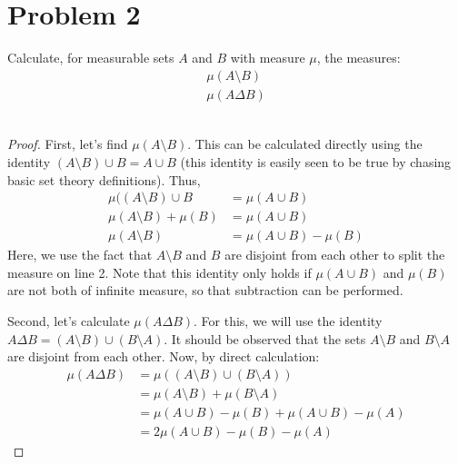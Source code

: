 \documentclass[fontsize=11pt]{scrartcl} %
\numberwithin{equation}{section} %
\numberwithin{figure}{section} %
\numberwithin{table}{section} %
\begin{document}
\section*{Problem 2}
Calculate, for measurable sets $A$ and $B$ with measure $\mu$, the measures:
\[
\begin{aligned}
\mu(A\setminus B)\\
\mu(A\Delta B)
\end{aligned}
\]
\\
\begin{proof}
First, let's find $\mu(A\setminus B)$. This can be calculated directly using the identity
$(A\setminus B) \cup B = A\cup B$ (this identity is easily seen to be true by chasing
basic set theory definitions). Thus,
\[
\begin{aligned}
\mu((A\setminus B) \cup B &= \mu(A\cup B)\\
\mu(A\setminus B) + \mu(B) &= \mu(A\cup B)\\
\mu(A\setminus B) &= \mu(A\cup B) - \mu(B)
\end{aligned}
\]
Here, we use the fact that $A\setminus B$ and $B$ are disjoint from each other to
split the measure on line 2. Note that this identity only holds if $\mu(A\cup B)$ and
$\mu(B)$ are not both of infinite measure, so that subtraction can be performed. 

Second, let's calculate $\mu(A\Delta B)$. For this, we will use the identity
$A\Delta B = (A\setminus B)\cup (B\setminus A)$. It should be observed that the sets
$A\setminus B$ and $B\setminus A$ are disjoint from each other. Now, by direct calculation:
\[
\begin{aligned}
\mu(A\Delta B)  &= \mu((A\setminus B)\cup (B\setminus A))\\
                &= \mu(A\setminus B) + \mu(B\setminus A)\\
                &= \mu(A\cup B) - \mu(B) + \mu(A\cup B) - \mu(A)\\
                &= 2\mu(A\cup B) - \mu(B) - \mu(A)
\end{aligned}
\]
\end{proof}

\end{document}
